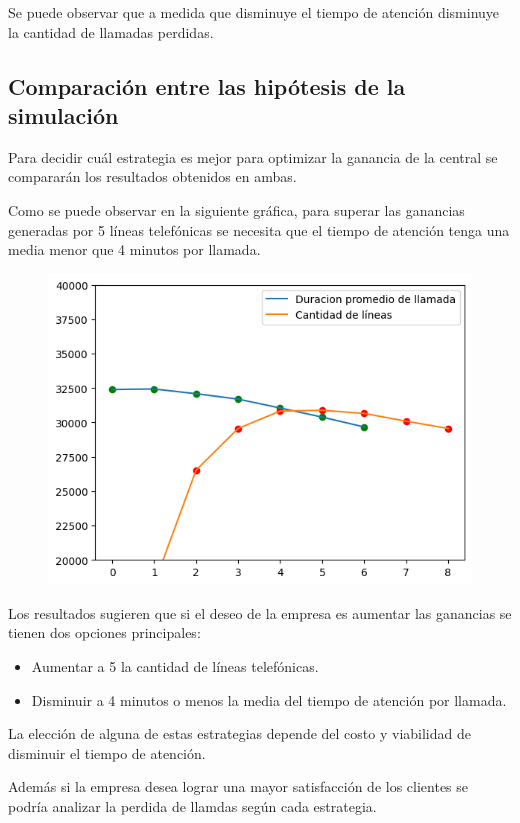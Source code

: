 \documentclass{article}
\begin{document}
			Se puede observar que a medida que disminuye el tiempo de atención disminuye la cantidad de llamadas perdidas. 
			\smallskip
			
			\subsection*{Comparación entre las hipótesis de la simulación}
			Para decidir cuál estrategia es mejor para optimizar la ganancia de la central se compararán los resultados obtenidos en ambas. 
			\vspace{0.2cm}
			
			Como se puede observar en la siguiente gráfica, para superar las ganancias generadas por 5 líneas telefónicas se necesita que el tiempo de atención tenga una media menor que 4 minutos por llamada. 
			
			\begin{figure}[H]
				\centering
				\includegraphics[width=0.7\linewidth]{./output5.png}
				\label{fig:enter-label}
			\end{figure}
			
			Los resultados sugieren que si el deseo de la empresa es aumentar las ganancias se tienen dos opciones principales:
			
			\begin{itemize}[left=3em]
				\item Aumentar a 5 la cantidad de líneas telefónicas.
				\item Disminuir a 4 minutos o menos la media del tiempo de atención por llamada.
			\end{itemize}
			
			
			La elección de alguna de estas estrategias depende del costo y viabilidad de disminuir el tiempo de atención.
			\vspace{0.4cm}
			
			Además si la empresa desea lograr una mayor satisfacción de los clientes se podría analizar la perdida de llamdas según cada estrategia.
			
\end{document}
